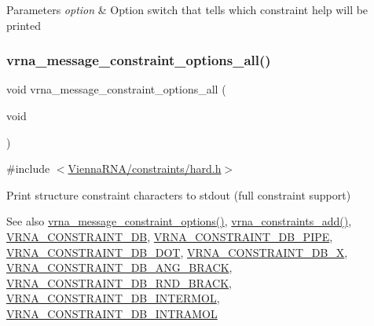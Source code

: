 \begin{DoxyParams}{Parameters}
{\em option} & Option switch that tells which constraint help will be printed \\
\hline
\end{DoxyParams}
\mbox{\label{group__constraints_gaec7e13fa0465c2acc7a621d1aecb709f}} 
\subsubsection{\texorpdfstring{vrna\_message\_constraint\_options\_all()}{vrna\_message\_constraint\_options\_all()}}
{\footnotesize\ttfamily void vrna\+\_\+message\+\_\+constraint\+\_\+options\+\_\+all (\begin{DoxyParamCaption}\item[{void}]{ }\end{DoxyParamCaption})}



{\ttfamily \#include $<$\mbox{\hyperlink{hard_8h}{Vienna\+R\+N\+A/constraints/hard.\+h}}$>$}



Print structure constraint characters to stdout (full constraint support) 

\begin{DoxySeeAlso}{See also}
\mbox{\hyperlink{group__constraints_gaa1f20b53bf09ac2e6b0dbb13f7d89670}{vrna\+\_\+message\+\_\+constraint\+\_\+options()}}, \mbox{\hyperlink{group__constraints_ga35a401f680969a556858a8dd5f1d07cc}{vrna\+\_\+constraints\+\_\+add()}}, \mbox{\hyperlink{group__hard__constraints_ga4bfc2f15c4f261c62a11af9d2aa80c90}{V\+R\+N\+A\+\_\+\+C\+O\+N\+S\+T\+R\+A\+I\+N\+T\+\_\+\+DB}}, \mbox{\hyperlink{group__hard__constraints_ga13053547a2de5532b64b64d35e097ae1}{V\+R\+N\+A\+\_\+\+C\+O\+N\+S\+T\+R\+A\+I\+N\+T\+\_\+\+D\+B\+\_\+\+P\+I\+PE}}, \mbox{\hyperlink{group__hard__constraints_ga369bea82eae75fbe626f409fa425747e}{V\+R\+N\+A\+\_\+\+C\+O\+N\+S\+T\+R\+A\+I\+N\+T\+\_\+\+D\+B\+\_\+\+D\+OT}}, \mbox{\hyperlink{group__hard__constraints_ga7283bbe0f8954f7b030ecc3f2d1932b2}{V\+R\+N\+A\+\_\+\+C\+O\+N\+S\+T\+R\+A\+I\+N\+T\+\_\+\+D\+B\+\_\+X}}, \mbox{\hyperlink{hard_8h_ad54c1315a47d55653dcaa5de6e544b77}{V\+R\+N\+A\+\_\+\+C\+O\+N\+S\+T\+R\+A\+I\+N\+T\+\_\+\+D\+B\+\_\+\+A\+N\+G\+\_\+\+B\+R\+A\+CK}}, \mbox{\hyperlink{group__hard__constraints_gac17b034852c914bc5879954c65d7e74b}{V\+R\+N\+A\+\_\+\+C\+O\+N\+S\+T\+R\+A\+I\+N\+T\+\_\+\+D\+B\+\_\+\+R\+N\+D\+\_\+\+B\+R\+A\+CK}}, \mbox{\hyperlink{group__hard__constraints_ga31d0ebb9755ca8a4acafc14f00ca755d}{V\+R\+N\+A\+\_\+\+C\+O\+N\+S\+T\+R\+A\+I\+N\+T\+\_\+\+D\+B\+\_\+\+I\+N\+T\+E\+R\+M\+OL}}, \mbox{\hyperlink{group__hard__constraints_ga5c17253f5a39d1d49b0fb11f5196982a}{V\+R\+N\+A\+\_\+\+C\+O\+N\+S\+T\+R\+A\+I\+N\+T\+\_\+\+D\+B\+\_\+\+I\+N\+T\+R\+A\+M\+OL}} 
\end{DoxySeeAlso}
